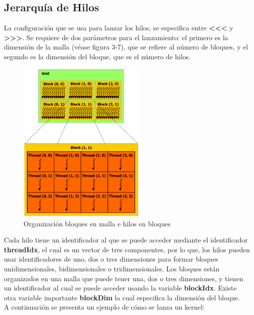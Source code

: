 \subsection{Jerarquía de Hilos}
La configuración que se usa para lanzar los hilos, se especifica entre  \textbf{\textless\textless\textless} y \textbf{\textgreater\textgreater\textgreater}. Se requiere de dos parámetros para el lanzamiento: el primero es la dimensión de la malla (véase figura 3-7), que se refiere al número de bloques, y el segundo es la dimensión del bloque, que es el número de hilos. 
\begin{figure}[H]
                      \centering
                              \includegraphics[height=8cm]{img/grid_block.png}
                      \caption{Organización bloques en malla e hilos en bloques \cite{Flops}}
\end{figure}
Cada hilo tiene un identificador al que se puede acceder mediante el identificador  \textbf{threadIdx}, el cual es un vector de tres componentes, por lo que, los hilos pueden usar identificadores de uno, dos o tres dimensiones para formar bloques unidimensionales, bidimensionales o tridimensionales. Los bloques están organizados en una malla que puede tener una, dos o tres dimensiones, y tienen un identificador al cual se puede acceder usando la variable \textbf{blockIdx}. Existe otra variable importante \textbf{blockDim} la cual especifica la dimensión del bloque.\\
A continuación se presenta un ejemplo de cómo se lanza un kernel:
\singlespacing
{}
